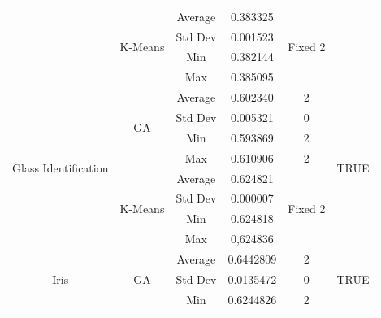 \documentclass[journal]{IEEEtran}
\begin{document}
\begin{table}[]
\begin{tabular}{|c|c|c|c|c|c|}
		& \multirow{4}{*}{K-Means} & Average             & 0.383325         & \multirow{4}{*}{Fixed 2} &                       \\ \cline{3-4}
		&                          & Std Dev             & 0.001523         &                          &                       \\ \cline{3-4}
		&                          & Min                 & 0.382144         &                          &                       \\ \cline{3-4}
		&                          & Max                 & 0.385095         &                          &                       \\ \hline
		\multirow{8}{*}{Glass Identification}  & \multirow{4}{*}{GA}      & Average             & 0.602340         & 2                        & \multirow{8}{*}{TRUE} \\ \cline{3-5}
		&                          & Std Dev             & 0.005321         & 0                        &                       \\ \cline{3-5}
		&                          & Min                 & 0.593869         & 2                        &                       \\ \cline{3-5}
		&                          & Max                 & 0.610906         & 2                        &                       \\ \cline{2-5}
		& \multirow{4}{*}{K-Means} & Average             & 0.624821         & \multirow{4}{*}{Fixed 2} &                       \\ \cline{3-4}
		&                          & Std Dev             & 0.000007         &                          &                       \\ \cline{3-4}
		&                          & Min                 & 0.624818         &                          &                       \\ \cline{3-4}
		&                          & Max                 & 0,624836         &                          &                       \\ \hline
		\multirow{8}{*}{Iris}                  & \multirow{4}{*}{GA}      & Average             & 0.6442809        & 2                        & \multirow{8}{*}{TRUE} \\ \cline{3-5}
		&                          & Std Dev             & 0.0135472        & 0                        &                       \\ \cline{3-5}
		&                          & Min                 & 0.6244826        & 2                        &                       \\ \cline{3-5}

\end{tabular}
\end{table}
\end{document}
